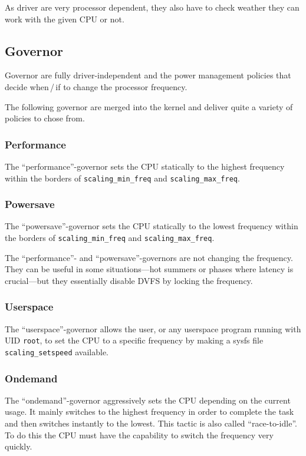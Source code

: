 As driver are very processor dependent, they also have to check weather they can work with the given CPU or not.

%
\subsection{Governor}
Governor are fully driver-independent and the power management policies that decide when\,/\,if to change the processor frequency.

The following governor are merged into the kernel and deliver quite a variety of policies to chose from.

\subsubsection{Performance}
The ``performance''-governor sets the CPU statically to the highest frequency within the borders of \lstinline!scaling_min_freq! and \lstinline!scaling_max_freq!.

\subsubsection{Powersave}
The ``powersave''-governor sets the CPU statically to the lowest frequency within the borders of \lstinline!scaling_min_freq! and \lstinline!scaling_max_freq!.

\superpar
The ``performance''- and ``powersave''-governors are not changing the frequency. They can be useful in some situations---hot summers or phases where latency is crucial---but they essentially disable DVFS by locking the frequency.

\subsubsection{Userspace}
The ``userspace''-governor allows the user, or any userspace program running with UID \lstinline!root!, to set the CPU to a specific frequency by making a sysfs file \lstinline!scaling_setspeed! available.

\subsubsection{Ondemand}
The ``ondemand''-governor aggressively sets the CPU depending on the current usage. It mainly switches to the highest frequency in order to complete the task and then switches instantly to the lowest. This tactic is also called ``race-to-idle''. To do this the CPU must have the capability to switch the frequency very quickly.

